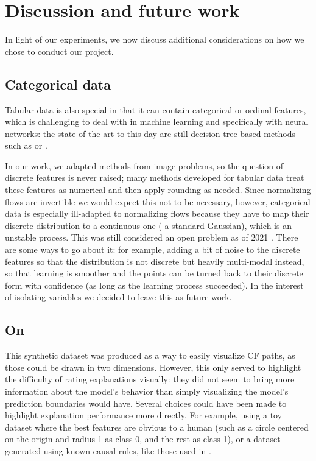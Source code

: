 \documentclass[../main.tex]{subfiles}
\begin{document}
\chapter{Discussion and future work}
\label{ch:discussion}

In light of our experiments, we now discuss additional considerations on how we chose to conduct our project.

\section{Categorical data}

Tabular data is also special in that it can contain categorical or ordinal features, which is challenging to deal with in machine learning and specifically with neural networks: the state-of-the-art to this day are still decision-tree based methods such as  \cite{chenXGBoost2016} or  \cite{prokhorenkovaCatBoost2018}.

In our work, we adapted methods from image problems, so the question of discrete features is never raised; many methods developed for tabular data treat these features as numerical and then apply rounding as needed.
Since normalizing flows are invertible we would expect this not to be necessary, however, categorical data is especially ill-adapted to normalizing flows because they have to map their discrete distribution to a continuous one (\eg{} a standard Gaussian), which is an unstable process.
This was still considered an open problem as of 2021 \cite{kobyzevNormalizing2021}.
There are some ways to go about it: for example, adding a bit of noise to the discrete features so that the distribution is not discrete but heavily multi-modal instead, so that learning is smoother and the points can be turned back to their discrete form with confidence (as long as the learning process succeeded).
In the interest of isolating variables we decided to leave this as future work.

\section{On \CakeOnSea}

This synthetic dataset was produced as a way to easily visualize CF paths, as those could be drawn in two dimensions.
However, this only served to highlight the difficulty of rating explanations visually: they did not seem to bring more information about the model's behavior than simply visualizing the model's prediction boundaries would have.
Several choices could have been made to highlight explanation performance more directly.
For example, using a toy dataset where the best features are obvious to a human (such as a circle centered on the origin and radius 1 as class 0, and the rest as class 1), or a dataset generated using known causal rules, like those used in \cite{karimiAlgorithmic2020}.
\end{document}
